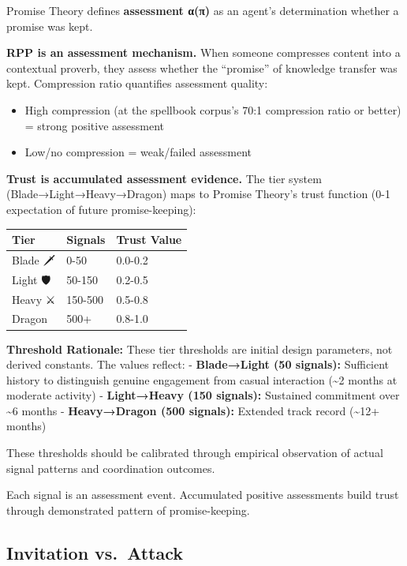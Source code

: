 \documentclass[
]{article}
\newcounter{none} %
\providecommand{\tightlist}{%
  \setlength{\itemsep}{0pt}\setlength{\parskip}{0pt}}
\begin{document}
Promise Theory defines \textbf{assessment α(π)} as an agent's
determination whether a promise was kept.

\textbf{RPP is an assessment mechanism.} When someone compresses content
into a contextual proverb, they assess whether the ``promise'' of
knowledge transfer was kept. Compression ratio quantifies assessment
quality:

\begin{itemize}
\tightlist
\item
  High compression (at the spellbook corpus's 70:1 compression ratio or
  better) = strong positive assessment
\item
  Low/no compression = weak/failed assessment
\end{itemize}

\textbf{Trust is accumulated assessment evidence.} The tier system
(Blade→Light→Heavy→Dragon) maps to Promise Theory's trust function (0-1
expectation of future promise-keeping):

{\def\LTcaptype{none} %
\begin{longtable}[]{@{}lll@{}}
\toprule\noalign{}
Tier & Signals & Trust Value \\
\midrule\noalign{}
\endhead
\bottomrule\noalign{}
\endlastfoot
Blade 🗡️ & 0-50 & 0.0-0.2 \\
Light 🛡️ & 50-150 & 0.2-0.5 \\
Heavy ⚔️ & 150-500 & 0.5-0.8 \\
Dragon 🐉 & 500+ & 0.8-1.0 \\
\end{longtable}
}

\textbf{Threshold Rationale:} These tier thresholds are initial design
parameters, not derived constants. The values reflect: -
\textbf{Blade→Light (50 signals):} Sufficient history to distinguish
genuine engagement from casual interaction (\textasciitilde2 months at
moderate activity) - \textbf{Light→Heavy (150 signals):} Sustained
commitment over \textasciitilde6 months - \textbf{Heavy→Dragon (500
signals):} Extended track record (\textasciitilde12+ months)

These thresholds should be calibrated through empirical observation of
actual signal patterns and coordination outcomes.

Each signal is an assessment event. Accumulated positive assessments
build trust through demonstrated pattern of promise-keeping.

\subsection{Invitation vs.~Attack}\label{invitation-vs.-attack}
\end{document}
